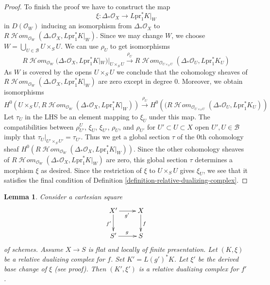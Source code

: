 \documentclass{stacks-project}
\theoremstyle{plain}
\newtheorem{lemma}[subsection]{Lemma}
\theoremstyle{definition}
\theoremstyle{remark}
\numberwithin{equation}{subsection}
\def\SheafHom{\mathop{\mathcal{H}\!\mathit{om}}\nolimits}
\begin{document}
\begin{proof}
\medskip\noindent
To finish the proof we have to construct the map
$$
\xi : \Delta_*\mathcal{O}_X \longrightarrow L\text{pr}_1^*K|_W
$$
in $D(\mathcal{O}_W)$ inducing an isomorphism from $\Delta_*\mathcal{O}_X$ to
$R\SheafHom_{\mathcal{O}_W}(\Delta_*\mathcal{O}_X, L\text{pr}_1^*K|_W)$.
Since we may change $W$, we choose
$W = \bigcup_{U \in \mathcal{B}} U \times_S U$.
We can use $\rho_U$ to get isomorphisms
$$
R\SheafHom_{\mathcal{O}_W}(
\Delta_*\mathcal{O}_X, L\text{pr}_1^*K|_W)|_{U \times_S U}
\xrightarrow{\rho_U}
R\SheafHom_{\mathcal{O}_{U \times_S U}}(
\Delta_*\mathcal{O}_U, L\text{pr}_1^*K_U)
$$
As $W$ is covered by the opens $U \times_S U$
we conclude that the cohomology sheaves of
$R\SheafHom_{\mathcal{O}_W}(\Delta_*\mathcal{O}_X, L\text{pr}_1^*K|_W)$
are zero except in degree $0$. Moreover, we obtain isomorphisms
$$
H^0\left(U \times_S U, R\SheafHom_{\mathcal{O}_W}(\Delta_*\mathcal{O}_X,
L\text{pr}_1^*K|_W)\right)
\xrightarrow{\rho_U}
H^0\left((R\SheafHom_{\mathcal{O}_{U \times_S U}}(
\Delta_*\mathcal{O}_U, L\text{pr}_1^*K_U)\right)
$$
Let $\tau_U$ in the LHS be an element mapping to $\xi_U$ under this map.
The compatibilities between
$\rho^U_{U'}$, $\xi_U$, $\xi_{U'}$, $\rho_U$, and $\rho_{U'}$
for $U' \subset U \subset X$ open $U', U \in \mathcal{B}$
imply that $\tau_U|_{U' \times_S U'} = \tau_{U'}$.
Thus we get a global section $\tau$ of the $0$th cohomology sheaf
$H^0(R\SheafHom_{\mathcal{O}_W}(\Delta_*\mathcal{O}_X, L\text{pr}_1^*K|_W))$.
Since the other cohomology sheaves of
$R\SheafHom_{\mathcal{O}_W}(\Delta_*\mathcal{O}_X, L\text{pr}_1^*K|_W)$
are zero, this global section $\tau$
determines a morphism $\xi$ as desired. Since the restriction
of $\xi$ to $U \times_S U$ gives $\xi_U$, we see that it
satisfies the final condition of
Definition \ref{definition-relative-dualizing-complex}.
\end{proof}

\begin{lemma}
\label{lemma-base-change-relative-dualizing}
Consider a cartesian square
$$
\xymatrix{
X' \ar[d]_{f'} \ar[r]_{g'} & X \ar[d]^f \\
S' \ar[r]^g & S
}
$$
of schemes. Assume $X \to S$ is flat and locally of finite presentation.
Let $(K, \xi)$ be a relative dualizing complex for $f$.
Set $K' = L(g')^*K$. Let $\xi'$ be the derived base change of $\xi$
(see proof). Then $(K', \xi')$ is a relative dualizing complex for $f'$.
\end{lemma}
\end{document}
